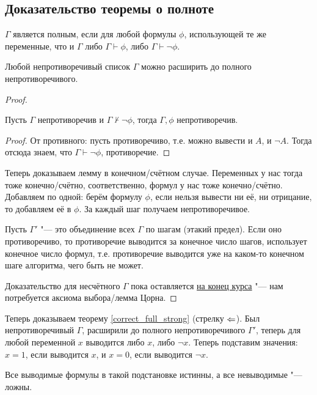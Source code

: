 \subsection{Доказательство теоремы о полноте}
\begin{Def}
	$\Gamma$ является полным, если для любой формулы $\phi$, использующей те же переменные, что и $\Gamma$
	либо $\Gamma \vdash \phi$, либо $\Gamma \vdash \lnot \phi$.
\end{Def}
\begin{lemma}
	Любой непротиворечивый список $\Gamma$ можно расширить до полного непротиворечивого.
\end{lemma}
\begin{proof}
	\begin{assertion}
		Пусть $\Gamma$ непротиворечив и $\Gamma \nvdash \lnot \phi$, тогда
		$\Gamma, \phi$ непротиворечив.
	\end{assertion}
	\begin{proof}
		От противного: пусть противоречиво, т.е. можно вывести и $A$, и $\lnot A$.
		Тогда отсюда знаем, что $\Gamma \vdash \lnot \phi$, противоречие.
	\end{proof}
	Теперь доказываем лемму в конечном/счётном случае.
	Переменных у нас тогда тоже конечно/счётно, соответственно, формул у нас тоже конечно/счётно.
	Добавляем по одной: берём формулу $\phi$, если нельзя вывести ни её, ни отрицание, то добавляем её в $\phi$.
	За каждый шаг получаем непротиворечивое.

	Пусть $\Gamma'$ "--- это объединение всех $\Gamma$ по шагам (этакий предел).
	Если оно противоречиво, то противоречие выводится за конечное число шагов, использует конечное число формул,
	т.е. противоречие выводится уже на каком-то конечном шаге алгоритма, чего быть не может.

	Доказательство для несчётного $\Gamma$ пока оставляется \hyperref[zorn_lemma_exmp_list_full]{на конец курса} "--- нам потребуется аксиома выбора/лемма Цорна.
\end{proof}
Теперь доказываем теорему \ref{correct_full_strong} (стрелку $\Leftarrow$).
Был непротиворечивый $\Gamma$, расширили до полного непротиворечивого $\Gamma'$, теперь для любой переменной $x$ выводится либо $x$, либо $\lnot x$.
Теперь подставим значения: $x=1$, если выводится $x$, и $x=0$, если выводится $\lnot x$.
\begin{assertion}
	Все выводимые формулы в такой подстановке истинны, а все невыводимые "--- ложны.
\end{assertion}
